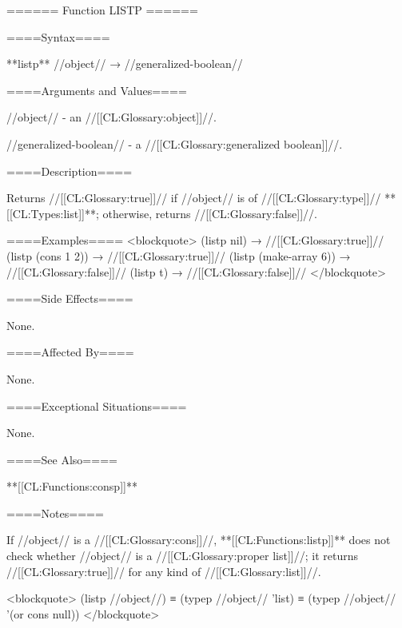 ====== Function LISTP ======

====Syntax====

**listp** //object// → //generalized-boolean//

====Arguments and Values====

//object// - an //[[CL:Glossary:object]]//.

//generalized-boolean// - a //[[CL:Glossary:generalized boolean]]//.

====Description====

Returns //[[CL:Glossary:true]]// if //object// is of //[[CL:Glossary:type]]// **[[CL:Types:list]]**; otherwise, returns //[[CL:Glossary:false]]//.

====Examples==== <blockquote> (listp nil) → //[[CL:Glossary:true]]// (listp (cons 1 2)) → //[[CL:Glossary:true]]// (listp (make-array 6)) → //[[CL:Glossary:false]]// (listp t) → //[[CL:Glossary:false]]// </blockquote>

====Side Effects====

None.

====Affected By====

None.

====Exceptional Situations====

None.

====See Also====

**[[CL:Functions:consp]]**

====Notes====

If //object// is a //[[CL:Glossary:cons]]//, **[[CL:Functions:listp]]** does not check whether //object// is a //[[CL:Glossary:proper list]]//; it returns //[[CL:Glossary:true]]// for any kind of //[[CL:Glossary:list]]//.

<blockquote> (listp //object//) ≡ (typep //object// 'list) ≡ (typep //object// '(or cons null)) </blockquote>

